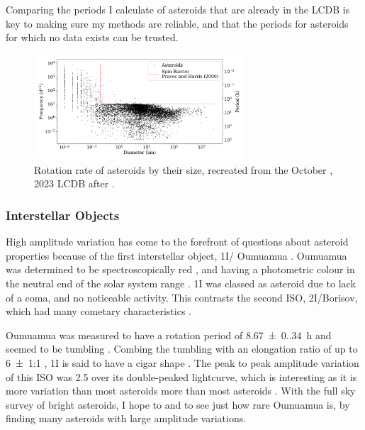 \documentclass{UCreport}
\DeclareRobustCommand{\okina}{%
  \raisebox{\dimexpr\fontcharht\font`A-\height}{%
    \scalebox{0.8}{`}%
  }%
}
\newcommand{\omuamua}{\okina Oumuamua }
\begin{document}
Comparing the periods I calculate of asteroids that are already in the LCDB is key to making sure my methods are reliable, and that the periods for asteroids for which no data exists can be trusted.

\begin{figure}[h]
  \centering
  \includegraphics[width=0.7\textwidth]{./Figures/Diam-FreqPlot.pdf}
  \caption[Asteroid frequencies vs diameter (LCDB)]{
    Rotation rate of asteroids by their size, recreated from the  October , 2023 LCDB after \citet{Warner2009}.
  }
  \label{Fig:FreqVsDiam}
\end{figure}

\subsubsection*{Interstellar Objects}
High amplitude variation has come to the forefront of questions about asteroid properties because of the first interstellar object, 1I/\omuamua \citep[see][for a review]{Bannister2019}.
\omuamua was determined to be spectroscopically red \citep{Fitzsimmons2017, Meech2017}, and having a photometric colour in the neutral end of the solar system range \citep{Bannister2017}.
1I was classed as asteroid due to lack of a coma, and no noticeable activity.
This contrasts the second ISO, 2I/Borisov, which had many cometary characteristics \citep[see ][for a review]{Dorofeeva2023}.

\omuamua was measured to have a rotation period of \qty{8.67(0.34)}{\hour} \citep{Belton2018} and seemed to be tumbling \citep[e.g.][]{Drahus2018,Fraser2018}.
Combing the tumbling with an elongation ratio of up to \qty{6(1)}{}:1 \citep{McNeill2018}, 1I is said to have a cigar shape \citep{Belton2018}.
The peak to peak amplitude variation of this ISO was \qty{2.5}{\mag} \citep{Meech2017} over its double-peaked lightcurve, which is interesting as it is more variation than most asteroids more than most asteroids \citep[as seen in the LCDB of][]{Warner2009}.
With the full sky survey of bright asteroids, I hope to and to see just how rare \omuamua is, by finding many asteroids with large amplitude variations.
\end{document}
